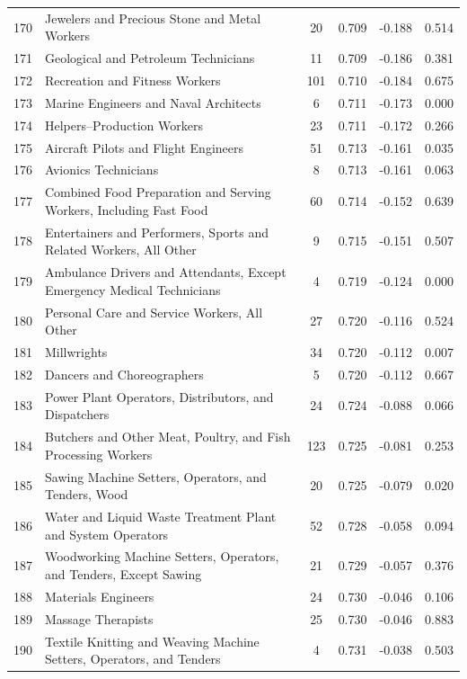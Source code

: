 {\begin{longtable}{llcccc}
 170 & Jewelers and Precious Stone and Metal Workers & 20 & 0.709 & -0.188 & 0.514 \\
 171 & Geological and Petroleum Technicians & 11 & 0.709 & -0.186 & 0.381 \\
 172 & Recreation and Fitness Workers & 101 & 0.710 & -0.184 & 0.675 \\
 173 & Marine Engineers and Naval Architects & 6 & 0.711 & -0.173 & 0.000 \\
 174 & Helpers--Production Workers & 23 & 0.711 & -0.172 & 0.266 \\
 175 & Aircraft Pilots and Flight Engineers & 51 & 0.713 & -0.161 & 0.035 \\
 176 & Avionics Technicians & 8 & 0.713 & -0.161 & 0.063 \\
 177 & Combined Food Preparation and Serving Workers, Including Fast Food & 60 & 0.714 & -0.152 & 0.639 \\
 178 & Entertainers and Performers, Sports and Related Workers, All Other & 9 & 0.715 & -0.151 & 0.507 \\
 179 & Ambulance Drivers and Attendants, Except Emergency Medical Technicians & 4 & 0.719 & -0.124 & 0.000 \\
 180 & Personal Care and Service Workers, All Other & 27 & 0.720 & -0.116 & 0.524 \\
 181 & Millwrights & 34 & 0.720 & -0.112 & 0.007 \\
 182 & Dancers and Choreographers & 5 & 0.720 & -0.112 & 0.667 \\
 183 & Power Plant Operators, Distributors, and Dispatchers & 24 & 0.724 & -0.088 & 0.066 \\
 184 & Butchers and Other Meat, Poultry, and Fish Processing Workers & 123 & 0.725 & -0.081 & 0.253 \\
 185 & Sawing Machine Setters, Operators, and Tenders, Wood & 20 & 0.725 & -0.079 & 0.020 \\
 186 & Water and Liquid Waste Treatment Plant and System Operators & 52 & 0.728 & -0.058 & 0.094 \\
 187 & Woodworking Machine Setters, Operators, and Tenders, Except Sawing & 21 & 0.729 & -0.057 & 0.376 \\
 188 & Materials Engineers & 24 & 0.730 & -0.046 & 0.106 \\
 189 & Massage Therapists & 25 & 0.730 & -0.046 & 0.883 \\
 190 & Textile Knitting and Weaving Machine Setters, Operators, and Tenders & 4 & 0.731 & -0.038 & 0.503 \\

\end{longtable}}
